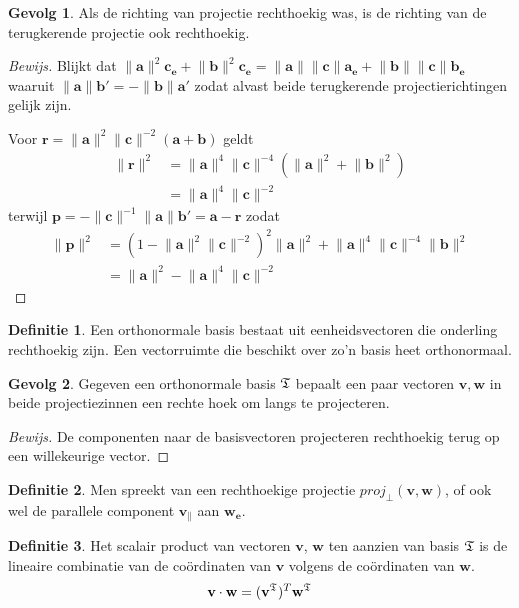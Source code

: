 \documentclass{amsart}
\theoremstyle{definition}
\newtheorem{dfn}{Definitie}[section]
\newtheorem{csq}{Gevolg}[section]
\newenvironment{bewijs}{\begin{proof}[Bewijs]}{\end{proof}}
\newcommand{\norm}[1]{\lVert{#1}\rVert}
\newcommand{\vvec}[1][v]{\mathbf{#1}}
\newcommand{\uvec}[1][v]{\vvec[#1]_\mathbf{e}}
\newcommand{\vnorm}[1]{\norm{\vvec[#1]}}
\newcommand{\vecrow}[1][a]{\mathfrak{\MakeUppercase{#1}}}
\newcommand{\cvec}[2]{{#1}^{#2}}
\newcommand{\cvecv}[2][v]{\cvec{\vvec[#1]}{#2}}
\newcommand{\cvecva}[1][a]{\cvecv{\vecrow[#1]}}
\newcommand{\cvecc}[2][a]{\cvecv[#2]{\vecrow[#1]}}
\begin{document}
\begin{csq}
    Als de richting van projectie rechthoekig was, is de richting van de terugkerende projectie ook rechthoekig.
    \begin{bewijs}
        Blijkt dat $\vnorm a^2\uvec[c] + \vnorm b^2\uvec[c] = \vnorm a\vnorm c\uvec[a] + \vnorm b\vnorm c\uvec[b]$ waaruit $\vnorm a\vvec[b'] = -\vnorm b\vvec[a']$ zodat alvast beide terugkerende projectierichtingen gelijk zijn.

        Voor $\vvec[r] = \vnorm a^2\vnorm c^{-2}(\vvec[a]+\vvec[b])$ geldt
        \begin{align*}
            \vnorm r^2
             & = \vnorm a^4\vnorm c^{-4}\left(\vnorm a^2 + \vnorm b^2\right) \\
             & = \vnorm a^4\vnorm c^{-2}
        \end{align*}
        terwijl $\vvec[p] = -\vnorm c^{-1}\vnorm a\vvec[b'] = \vvec[a] - \vvec[r]$ zodat
        \begin{align*}
            \vnorm p^2
             & = (1 - \vnorm a^2\vnorm c^{-2})^2\vnorm a^2 + \vnorm a^4\vnorm c^{-4}\vnorm b^2 \\
             & = \vnorm a^2 - \vnorm a^4\vnorm c^{-2}
        \end{align*}
    \end{bewijs}
\end{csq}

\begin{dfn}
    Een orthonormale basis bestaat uit eenheidsvectoren die onderling rechthoekig zijn. Een vectorruimte die beschikt over zo'n basis heet orthonormaal.
\end{dfn}

\begin{csq}
    Gegeven een orthonormale basis $\vecrow[t]$ bepaalt een paar vectoren $\vvec, \vvec[w]$ in beide projectiezinnen een rechte hoek om langs te projecteren.
    \begin{bewijs}
        De componenten naar de basisvectoren projecteren rechthoekig terug op een willekeurige vector.
    \end{bewijs}
\end{csq}

\begin{dfn}
    Men spreekt van een rechthoekige projectie $proj_\perp(\vvec, \vvec[w])$, of ook wel de parallele component $\vvec_\|$ aan $\uvec[w]$.
\end{dfn}

\begin{dfn}
    Het scalair product van vectoren $\vvec$, $\vvec[w]$ ten aanzien van basis $\vecrow[t]$ is de lineaire combinatie van de coördinaten van $\vvec$ volgens de coördinaten van $\vvec[w]$.
    \begin{equation*}
        \vvec \cdot \vvec[w] = (\cvecva[t])^T \cvecc[t]{w}
    \end{equation*}
\end{dfn}
\end{document}
